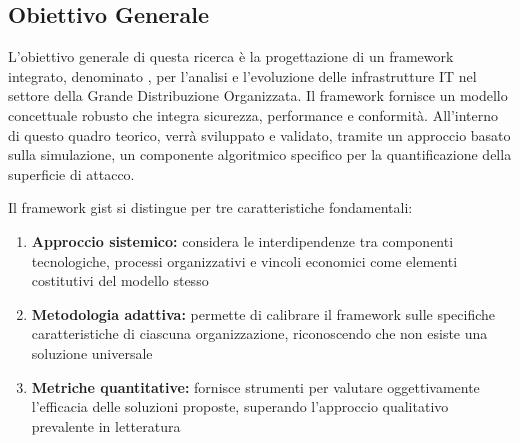 \subsection{\texorpdfstring{Obiettivo Generale}{1.3.1 - Obiettivo Generale}}
\label{subsec:obiettivo_generale}

L'obiettivo generale di questa ricerca è la progettazione di un framework integrato, denominato \textbf{}, per l'analisi e l'evoluzione delle infrastrutture IT nel settore della Grande Distribuzione Organizzata. Il framework fornisce un modello concettuale robusto che integra sicurezza, performance e conformità. All'interno di questo quadro teorico, verrà sviluppato e validato, tramite un approccio basato sulla simulazione, un componente algoritmico specifico per la quantificazione della superficie di attacco.

Il framework \gls{gist} si distingue per tre caratteristiche fondamentali:

\begin{enumerate}
\item \textbf{Approccio sistemico:} considera le interdipendenze tra componenti tecnologiche, processi organizzativi e vincoli economici come elementi costitutivi del modello stesso

\item \textbf{Metodologia adattiva:} permette di calibrare il framework sulle specifiche caratteristiche di ciascuna organizzazione, riconoscendo che non esiste una soluzione universale

\item \textbf{Metriche quantitative:} fornisce strumenti per valutare oggettivamente l'efficacia delle soluzioni proposte, superando l'approccio qualitativo prevalente in letteratura
\end{enumerate}

